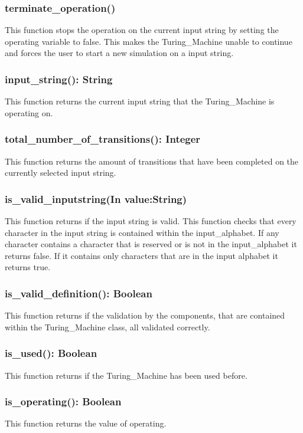 \documentclass{report}
\begin{document}
     \subsubsection{ terminate\_operation()  }
     This function stops the operation on the current input string by setting the operating variable to false. This makes the Turing\_Machine unable to continue and forces the user to start a new simulation on a input string.
     \subsubsection{ input\_string(): String  }     
     This function returns the current input string that the Turing\_Machine is operating on.
     \subsubsection{ total\_number\_of\_transitions(): Integer  }
     This function returns the amount of transitions that have been completed on the currently selected input string.
     
     \subsubsection{ is\_valid\_inputstring(In value:String)}
     This function returns if the input string is valid. This function checks that every character in the input string is contained within the input\_alphabet. If any character contains a character that is reserved or is not in the input\_alphabet it returns false. If it contains only characters that are in the input alphabet it returns true.   
     
     
     \subsubsection{ is\_valid\_definition(): Boolean  }
     This function returns if the validation by the components, that are contained within the Turing\_Machine class, all validated correctly.
     \subsubsection{ is\_used(): Boolean  }      
     This function returns if the Turing\_Machine has been used before.
     \subsubsection{ is\_operating(): Boolean  } 
     This function returns the value of operating.
\end{document}
